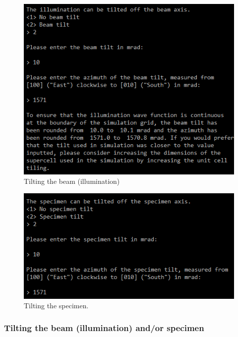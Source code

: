 \documentclass[12pt,a4paper]{article}
\begin{document}
%
\begin{figure}[!h]
	\begin{center}
		\includegraphics[scale=1.3]{figures/tilt_beam.png}
		\caption{Tilting the beam (illumination)}
		\label{fig:tilt_beam}
	\end{center}
\end{figure}
%
\begin{figure}[!h]
	\begin{center}
		\includegraphics[scale=1.3]{figures/tilt_specimen.png}
		\caption{Tilting the specimen.}
		\label{fig:tilt_specimen}
	\end{center}
\end{figure}

\subsubsection{Tilting the beam (illumination) and/or specimen}
\end{document}
